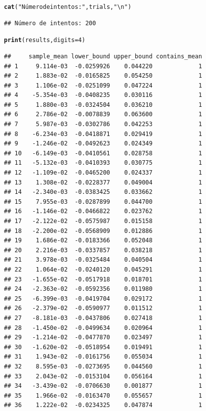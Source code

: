 \documentclass[12pt]{article}\usepackage[]{graphicx}\usepackage[]{xcolor}
\makeatletter
\newcommand{\hlnum}[1]{\textcolor[rgb]{0.686,0.059,0.569}{#1}}%
\newcommand{\hlsng}[1]{\textcolor[rgb]{0.192,0.494,0.8}{#1}}%
\newcommand{\hldef}[1]{\textcolor[rgb]{0.345,0.345,0.345}{#1}}%
\newcommand{\hlkwc}[1]{\textcolor[rgb]{0.333,0.667,0.333}{#1}}%
\newcommand{\hlkwd}[1]{\textcolor[rgb]{0.737,0.353,0.396}{\textbf{#1}}}%
\newenvironment{kframe}{%
 \def\at@end@of@kframe{}%
 \ifinner\ifhmode%
  \def\at@end@of@kframe{\end{minipage}}%
  \begin{minipage}{\columnwidth}%
 \fi\fi%
 \def\FrameCommand##1{\hskip\@totalleftmargin \hskip-\fboxsep
 \colorbox{shadecolor}{##1}\hskip-\fboxsep
     \hskip-\linewidth \hskip-\@totalleftmargin \hskip\columnwidth}%
 \MakeFramed {\advance\hsize-\width
   \@totalleftmargin\z@ \linewidth\hsize
   \@setminipage}}%
 {\par\unskip\endMakeFramed%
 \at@end@of@kframe}
\newenvironment{knitrout}{}{} %
\makeatother
\begin{document}
\begin{knitrout}
\begin{kframe}
\begin{alltt}
\hlkwd{cat}\hldef{(}\hlsng{"Número de intentos:"}\hldef{, trials,} \hlsng{"\textbackslash{}n"}\hldef{)}
\end{alltt}
\begin{verbatim}
## Número de intentos: 200
\end{verbatim}
\begin{alltt}
\hlkwd{print}\hldef{(results,} \hlkwc{digits}\hldef{=} \hlnum{4}\hldef{)}
\end{alltt}
\begin{verbatim}
##     sample_mean lower_bound upper_bound contains_mean
## 1     9.114e-03  -0.0259926    0.044220             1
## 2     1.883e-02  -0.0165825    0.054250             1
## 3     1.106e-02  -0.0251099    0.047224             1
## 4    -5.354e-03  -0.0408235    0.030116             1
## 5     1.880e-03  -0.0324504    0.036210             1
## 6     2.786e-02  -0.0078839    0.063600             1
## 7     5.987e-03  -0.0302786    0.042253             1
## 8    -6.234e-03  -0.0418871    0.029419             1
## 9    -1.246e-02  -0.0492623    0.024349             1
## 10   -6.149e-03  -0.0410561    0.028758             1
## 11   -5.132e-03  -0.0410393    0.030775             1
## 12   -1.109e-02  -0.0465200    0.024337             1
## 13    1.308e-02  -0.0228377    0.049004             1
## 14   -2.340e-03  -0.0383425    0.033662             1
## 15    7.955e-03  -0.0287899    0.044700             1
## 16   -1.146e-02  -0.0466822    0.023762             1
## 17   -2.122e-02  -0.0575987    0.015158             1
## 18   -2.200e-02  -0.0568909    0.012886             1
## 19    1.686e-02  -0.0183366    0.052048             1
## 20    2.216e-03  -0.0337857    0.038218             1
## 21    3.978e-03  -0.0325484    0.040504             1
## 22    1.064e-02  -0.0240120    0.045291             1
## 23   -1.655e-02  -0.0517918    0.018701             1
## 24   -2.363e-02  -0.0592356    0.011980             1
## 25   -6.399e-03  -0.0419704    0.029172             1
## 26   -2.379e-02  -0.0590977    0.011512             1
## 27   -8.181e-03  -0.0437806    0.027418             1
## 28   -1.450e-02  -0.0499634    0.020964             1
## 29   -1.214e-02  -0.0477870    0.023497             1
## 30   -1.620e-02  -0.0518954    0.019491             1
## 31    1.943e-02  -0.0161756    0.055034             1
## 32    8.595e-03  -0.0273695    0.044560             1
## 33    2.043e-02  -0.0153104    0.056164             1
## 34   -3.439e-02  -0.0706630    0.001877             1
## 35    1.966e-02  -0.0163470    0.055657             1
## 36    1.222e-02  -0.0234325    0.047874             1

\end{verbatim}
\end{kframe}
\end{knitrout}
\end{document}
